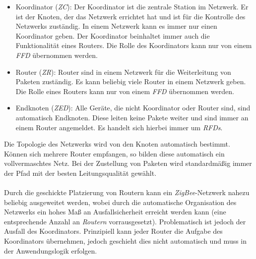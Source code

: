                 \begin{itemize}
                    \item{Koordinator (\emph{ZC}):} Der Koordinator ist die zentrale Station im Netzwerk.
                                        Er ist der Knoten, der das Netzwerk errichtet hat
                                        und ist für die Kontrolle des Netzwerks zuständig.
                                        In einem Netzwerk kann es immer nur einen Koordinator
                                        geben. Der Koordinator beinhaltet immer auch
                                        die Funktionalität eines Routers. Die Rolle des Koordinators kann nur von einem
                                        \emph{FFD} übernommen werden.
                    \item{Router (\emph{ZR}):} Router sind in einem Netzwerk für die Weiterleitung von
                                   Paketen zuständig. Es kann beliebig viele Router in einem
                                   Netzwerk geben. Die Rolle eines Routers kann nur von einem
                                   \emph{FFD} übernommen werden.
                    \item{Endknoten (\emph{ZED}):} Alle Geräte, die nicht Koordinator oder Router sind,
                                            sind automatisch Endknoten. Diese leiten keine Pakete
                                            weiter und sind immer an einem Router angemeldet.
                                            Es handelt sich hierbei immer um \emph{RFDs}.
                \end{itemize}

                Die Topologie des Netzwerks wird von den Knoten automatisch bestimmt. Können
                sich mehrere Router empfangen, so bilden diese automatisch ein vollvermaschtes
                Netz. Bei der Zustellung von Paketen wird standardmäßig immer der Pfad mit
                der besten Leitungsqualität gewählt.\\
                \\
                Durch die geschickte Platzierung von Routern kann ein \emph{ZigBee}-Netzwerk
                nahezu beliebig ausgeweitet werden, wobei durch die automatische Organisation
                des Netzwerks ein hohes Maß an Ausfallsicherheit erreicht werden kann (eine entsprechende
                Anzahl an \emph{Routern} vorrausgesetzt). Problematisch ist jedoch der Ausfall des
                Koordinators. Prinzipiell kann jeder Router die Aufgabe des Koordinators übernehmen,
                jedoch geschieht dies nicht automatisch und muss in der Anwendungslogik erfolgen.

